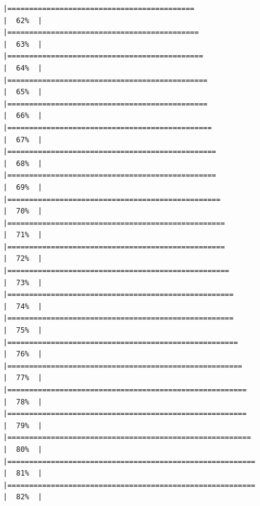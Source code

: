 \documentclass[
]{article}
\begin{document}
\begin{verbatim}
|===========================================                           |  62%  |                                                                              |============================================                          |  63%  |                                                                              |=============================================                         |  64%  |                                                                              |==============================================                        |  65%  |                                                                              |==============================================                        |  66%  |                                                                              |===============================================                       |  67%  |                                                                              |================================================                      |  68%  |                                                                              |================================================                      |  69%  |                                                                              |=================================================                     |  70%  |                                                                              |==================================================                    |  71%  |                                                                              |==================================================                    |  72%  |                                                                              |===================================================                   |  73%  |                                                                              |====================================================                  |  74%  |                                                                              |====================================================                  |  75%  |                                                                              |=====================================================                 |  76%  |                                                                              |======================================================                |  77%  |                                                                              |=======================================================               |  78%  |                                                                              |=======================================================               |  79%  |                                                                              |========================================================              |  80%  |                                                                              |=========================================================             |  81%  |                                                                              |=========================================================             |  82%  |                                                                              
\end{verbatim}
\end{document}
